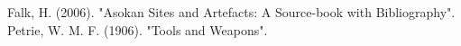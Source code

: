 \documentclass{article}
\begin{document}
\begin{thebibliography}{99}
 Falk, H. (2006). "Asokan Sites and Artefacts: A Source-book with Bibliography". 
 Petrie, W. M. F. (1906). "Tools and Weapons". 
\end{thebibliography}

\end{document}
